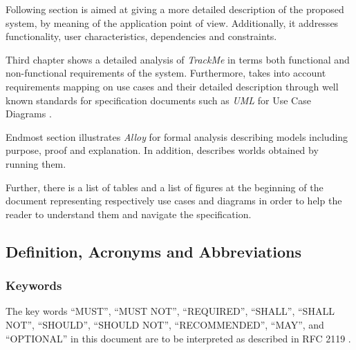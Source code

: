 \documentclass[a4paper]{article}
\begin{document}
        Following section is aimed at giving a more detailed description of the proposed system, by meaning of the application point of view. Additionally, it addresses functionality, user characteristics, dependencies and constraints.
        
        Third chapter shows a detailed analysis of \textit{TrackMe} in terms both functional and non-functional requirements of the system. Furthermore, takes into account requirements mapping on use cases and their detailed description through well known standards for specification documents such as \textit{UML} for Use Case Diagrams \cite{rumbaugh2004unified}.
        
        Endmost section illustrates \textit{Alloy} for formal analysis \cite{jackson2006software} describing models including purpose, proof and explanation. In addition, describes worlds obtained by running them.
        
        Further, there is a list of tables and a list of figures at the beginning of the document representing respectively use cases and diagrams in order to help the reader to understand them and navigate the specification.
        
    \subsection{Definition, Acronyms and  Abbreviations}
            \subsubsection{Keywords}
            The key words “MUST”, “MUST NOT”, “REQUIRED”, “SHALL”, “SHALL NOT”, “SHOULD”, “SHOULD NOT”, “RECOMMENDED”, “MAY”, and “OPTIONAL” in this document are to be interpreted as described in RFC 2119 \cite{bradner1997key}.
\end{document}
